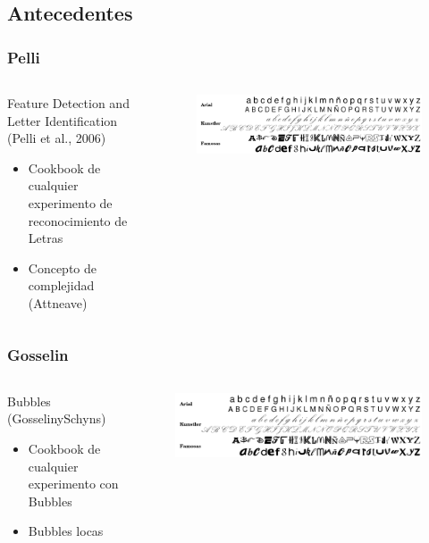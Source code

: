 \documentclass{beamer}
\begin{document}
\subsection{Antecedentes}
\begin{frame}
\frametitle{Pelli}
\begin{columns}[t]
\begin{block}{Feature Detection and Letter Identification (Pelli et al., 2006)}
\begin{itemize}
 \item Cookbook de cualquier experimento de reconocimiento de Letras
 \item Concepto de complejidad (Attneave)
\end{itemize}

\end{block}

\begin{figure}
 \includegraphics[scale=.20]{graficos/letras.png}
\end{figure}

\end{columns}
\end{frame}

\begin{frame}
 \frametitle{Gosselin}
 \begin{columns}[t]
   \begin{block}{Bubbles (GosselinySchyns)}
    \begin{itemize}
    \item Cookbook de cualquier experimento con Bubbles
    \item Bubbles locas
    \end{itemize}
   \end{block}
   \begin{figure}
   \includegraphics[scale=.20]{graficos/letras.png}
   \end{figure}
  \end{columns}
\end{frame}
\end{document}
